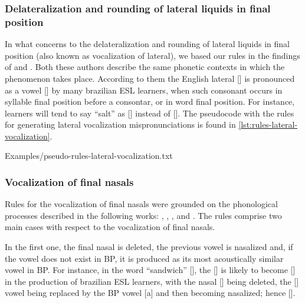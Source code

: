 \subsubsection{Delateralization and rounding of lateral liquids in final position}
In what concerns to the delateralization and rounding of lateral liquids in final position (also known as vocalization of lateral), we based
our rules in the findings of \citeauthor{Baratieri2006} \citep{Baratieri2006} and \citeauthor{Moore2008} \citep{Moore2008}. Both these authors
describe the same phonetic contexts in which the phenomenon takes place. According to them the English lateral [] is
pronounced as a vowel [] by many brazilian \ac{ESL} learners, when such consonant occurs in syllable final position before
a consontar, or in word final position. For instance, learners will tend to say ``salt'' as [] instead of [].
The pseudocode with the rules for generating lateral vocalization mispronunciations is found in \autoref{lst:rules-lateral-vocalization}.

%
    {Examples/pseudo-rules-lateral-vocalization.txt}

\clearpage
\subsubsection{Vocalization of final nasals}

Rules for the vocalization of final nasals were grounded on the phonological processes described in the following works:
\citeauthor{Kluge2007} \citep{Kluge2007}, \citeauthor{Kluge2008} \citep{Kluge2008}, \citeauthor{Kluge2012} \citep{Kluge2012}, 
\citeauthor{Silveira2007} \citep{Silveira2007} and \citeauthor{Silveira2012} \citep{Silveira2012}.
The rules comprise two main cases with respect to the vocalization of final nasals. 

In the first one, the
final nasal is deleted, the previous vowel is nasalized and, if the vowel does not exist in \ac{BP}, it is produced as its
most acoustically similar vowel in \ac{BP}. For instance, in the word ``sandwich'' [],
the  [] is likely
to become [] in the production of brazilian \ac{ESL} learners, with the nasal [] being deleted, the 
[\textipa{\ae}] vowel being replaced by the \ac{BP} vowel [a] and then becoming nasalized; hence []. 

